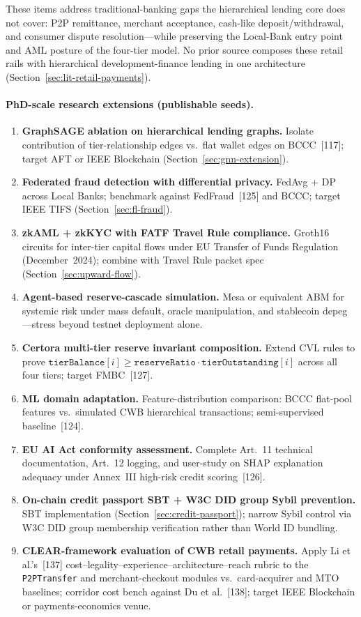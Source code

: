 \documentclass[12pt,a4paper]{report}
\begin{document}
These items address traditional-banking gaps the hierarchical lending core does not cover: P2P remittance, merchant acceptance, cash-like deposit/withdrawal, and consumer dispute resolution---while preserving the Local-Bank entry point and AML posture of the four-tier model. No prior source composes these retail rails with hierarchical development-finance lending in one architecture (Section~\ref{sec:lit-retail-payments}).

\paragraph{PhD-scale research extensions (publishable seeds).}
\begin{enumerate}[noitemsep]
\item \textbf{GraphSAGE ablation on hierarchical lending graphs.} Isolate contribution of tier-relationship edges vs.\ flat wallet edges on BCCC~[117]; target AFT or IEEE Blockchain (Section~\ref{sec:gnn-extension}).
\item \textbf{Federated fraud detection with differential privacy.} FedAvg + DP across Local Banks; benchmark against FedFraud~[125] and BCCC; target IEEE TIFS (Section~\ref{sec:fl-fraud}).
\item \textbf{zkAML + zkKYC with FATF Travel Rule compliance.} Groth16 circuits for inter-tier capital flows under EU Transfer of Funds Regulation (December~2024); combine with Travel Rule packet spec (Section~\ref{sec:upward-flow}).
\item \textbf{Agent-based reserve-cascade simulation.} Mesa or equivalent ABM for systemic risk under mass default, oracle manipulation, and stablecoin depeg---stress beyond testnet deployment alone.
\item \textbf{Certora multi-tier reserve invariant composition.} Extend CVL rules to prove $\texttt{tierBalance}[i] \ge \texttt{reserveRatio} \cdot \texttt{tierOutstanding}[i]$ across all four tiers; target FMBC~[127].
\item \textbf{ML domain adaptation.} Feature-distribution comparison: BCCC flat-pool features vs.\ simulated CWB hierarchical transactions; semi-supervised baseline~[124].
\item \textbf{EU AI Act conformity assessment.} Complete Art.~11 technical documentation, Art.~12 logging, and user-study on SHAP explanation adequacy under Annex~III high-risk credit scoring~[126].
\item \textbf{On-chain credit passport SBT + W3C DID group Sybil prevention.} SBT implementation (Section~\ref{sec:credit-passport}); narrow Sybil control via W3C DID group membership verification rather than World ID bundling.
\item \textbf{CLEAR-framework evaluation of CWB retail payments.} Apply Li et al.'s~[137] cost--legality--experience--architecture--reach rubric to the \texttt{P2PTransfer} and merchant-checkout modules vs.\ card-acquirer and MTO baselines; corridor cost bench against Du et al.~[138]; target IEEE Blockchain or payments-economics venue.
\end{enumerate}
\end{document}
